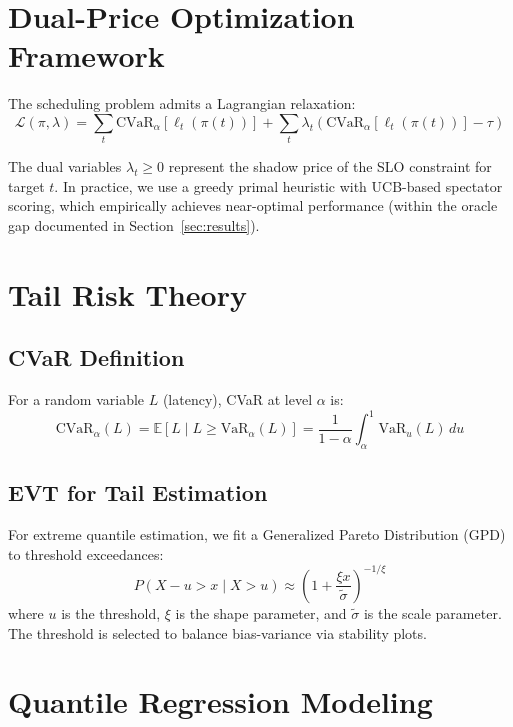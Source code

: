 \documentclass[11pt,twocolumn]{article}
\begin{document}
\section{Dual-Price Optimization Framework}

The scheduling problem admits a Lagrangian relaxation:
\begin{equation}
\mathcal{L}(\pi, \lambda) = \sum_t \text{CVaR}_\alpha[\ell_t(\pi(t))] + \sum_t \lambda_t \left(\text{CVaR}_\alpha[\ell_t(\pi(t))] - \tau\right)
\end{equation}

The dual variables $\lambda_t \geq 0$ represent the shadow price of the
SLO constraint for target $t$. In practice, we use a greedy primal
heuristic with UCB-based spectator scoring, which empirically achieves
near-optimal performance (within the oracle gap documented in Section~\ref{sec:results}).

\section{Tail Risk Theory}

\subsection{CVaR Definition}

For a random variable $L$ (latency), CVaR at level $\alpha$ is:
\begin{equation}
\text{CVaR}_\alpha(L) = \mathbb{E}[L \mid L \geq \text{VaR}_\alpha(L)]
= \frac{1}{1-\alpha} \int_\alpha^1 \text{VaR}_u(L) \, du
\end{equation}

\subsection{EVT for Tail Estimation}

For extreme quantile estimation, we fit a Generalized Pareto Distribution
(GPD) to threshold exceedances:
\begin{equation}
P(X - u > x \mid X > u) \approx \left(1 + \frac{\xi x}{\tilde{\sigma}}\right)^{-1/\xi}
\end{equation}
where $u$ is the threshold, $\xi$ is the shape parameter, and
$\tilde{\sigma}$ is the scale parameter. The threshold is selected
to balance bias-variance via stability plots.

\section{Quantile Regression Modeling}
\end{document}
